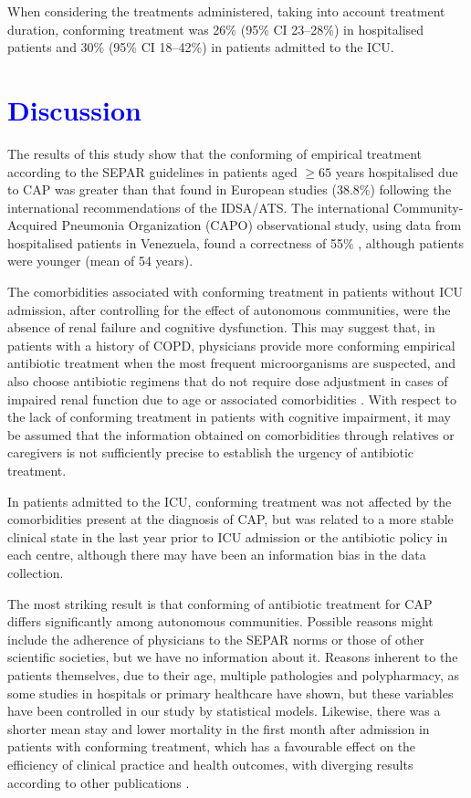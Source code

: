 \documentclass[11pt, a4paper]{article}
\begin{document}
\begin{multicols}{2}
When considering the treatments administered, taking into account treatment duration, conforming treatment was 26\% (95\% CI 23–28\%) in hospitalised patients and 30\% (95\% CI 18–42\%) in patients admitted to the ICU.

\section*{\textcolor{blue}{Discussion}}
The results of this study show that the conforming of empirical treatment according to the SEPAR guidelines in patients aged $\geq65$ years hospitalised due to CAP was greater than that found in European studies (38.8\%) \cite{rossio2015adherence} following the international recommendations of the IDSA/ATS. The international Community-Acquired Pneumonia Organization (CAPO) observational study, using data from hospitalised patients in Venezuela, found a correctness of 55\% \cite{levy2015cumplimiento}, although patients were younger (mean of 54 years).

The comorbidities associated with conforming treatment in patients without ICU admission, after controlling for the effect of autonomous communities, were the absence of renal failure and cognitive dysfunction. This may suggest that, in patients with a history of COPD, physicians provide more conforming empirical antibiotic treatment when the most frequent microorganisms are suspected, and also choose antibiotic regimens that do not require dose adjustment in cases of impaired renal function due to age or associated comorbidities \cite{petrosillo2015treatment}. With respect to the lack of conforming treatment in patients with cognitive impairment, it may be assumed that the information obtained on comorbidities through relatives or caregivers is not sufficiently precise to establish the urgency of antibiotic treatment.

In patients admitted to the ICU, conforming treatment was not affected by the comorbidities present at the diagnosis of CAP, but was related to a more stable clinical state in the last year prior to ICU admission or the antibiotic policy in each centre, although there may have been an information bias in the data collection.

The most striking result is that conforming of antibiotic treatment for CAP differs significantly among autonomous communities. Possible reasons might include the adherence of physicians to the SEPAR norms or those of other scientific societies, but we have no information about it. Reasons inherent to the patients themselves, due to their age, multiple pathologies and polypharmacy, as some studies in hospitals \cite{banqueri2014factors} or primary healthcare \cite{fernandez2013appropriateness, perez2002adecuacion} have shown, but these variables have been controlled in our study by statistical models. Likewise, there was a shorter mean stay and lower mortality in the first month after admission in patients with conforming treatment, which has a favourable effect on the efficiency of clinical practice and health outcomes, with diverging results according to other publications \cite{rossio2015adherence, ye2015improvement}.


\end{multicols}
\end{document}
